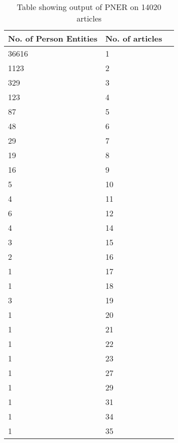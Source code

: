 \begin{table}[h]
  \begin{center}
\begin{tabular}{|l|l|l|}
    \hline
\textbf{No. of Person Entities} & \textbf{No. of articles} \\ \hline
36616                  & 1               \\ \hline
1123                   & 2               \\	\hline
329                    & 3               \\	\hline
123                    & 4               \\	\hline
87                     & 5               \\	\hline
48                     & 6               \\	\hline
29                     & 7               \\	\hline
19                     & 8               \\	\hline
16                     & 9               \\	\hline
5                      & 10              \\	\hline
4                      & 11              \\	\hline
6                      & 12              \\	\hline
4                      & 14              \\	\hline
3                      & 15              \\	\hline
2                      & 16              \\	\hline
1                      & 17              \\	\hline
1                      & 18              \\	\hline
3                      & 19              \\	\hline
1                      & 20              \\	\hline
1                      & 21              \\	\hline
1                      & 22              \\	\hline
1                      & 23              \\	\hline
1                      & 27              \\	\hline
1                      & 29              \\	\hline
1                      & 31              \\	\hline
1                      & 34              \\	\hline
1                      & 35              \\ 	\hline
\end{tabular}
\end{center}
\caption{Table showing output of PNER on 14020 articles}
\label{table:Table1}
\end{table}



